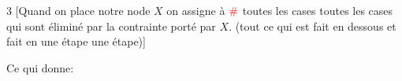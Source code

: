 \begin{multicols}{3}
[Quand on place notre node $X$ on assigne à $\textcolor{red}{\#}$ toutes les cases toutes les cases qui sont éliminé par la contrainte porté par $X$. (tout ce qui est fait en dessous et fait en une étape une étape)]
\end{multicols}

Ce qui donne:

